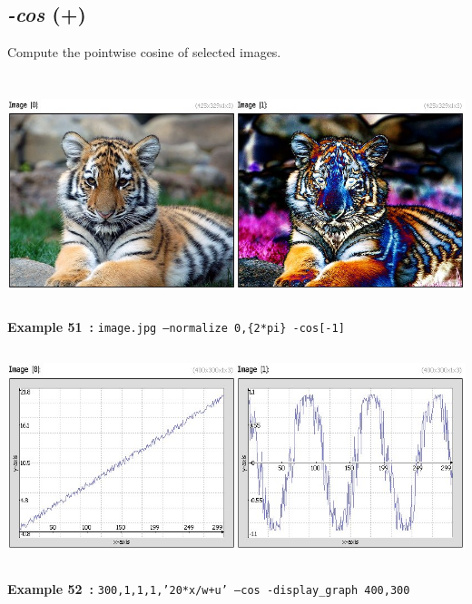 \documentclass[a4paper,11pt,twoside]{book}
\begin{document}
\subsection{\emph{-cos} (+)}\vspace*{-0.5em}
Compute the pointwise cosine of selected images.
\begin{center}\includegraphics[keepaspectratio=true,height=7cm,width=\textwidth]{img/gmic_def51.jpg}\\
{\footnotesize \textbf{Example 51~:} \texttt{image.jpg --normalize 0,\{2*pi\} -cos[-1]}}
\\\includegraphics[keepaspectratio=true,height=7cm,width=\textwidth]{img/gmic_def52.jpg}\\
{\footnotesize \textbf{Example 52~:} \texttt{300,1,1,1,'20*x/w+u' --cos -display\_graph 400,300}}
\end{center}
\end{document}
